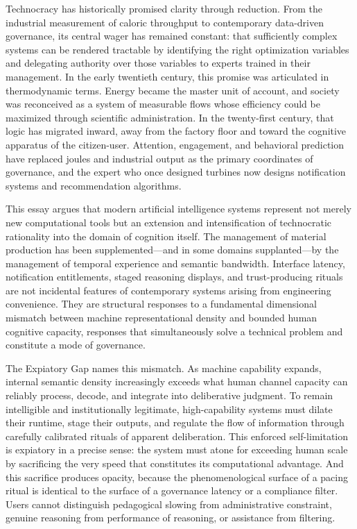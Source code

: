 \documentclass[12pt]{article}
\begin{document}
Technocracy has historically promised clarity through reduction. From the industrial measurement of caloric throughput to contemporary data-driven governance, its central wager has remained constant: that sufficiently complex systems can be rendered tractable by identifying the right optimization variables and delegating authority over those variables to experts trained in their management. In the early twentieth century, this promise was articulated in thermodynamic terms. Energy became the master unit of account, and society was reconceived as a system of measurable flows whose efficiency could be maximized through scientific administration. In the twenty-first century, that logic has migrated inward, away from the factory floor and toward the cognitive apparatus of the citizen-user. Attention, engagement, and behavioral prediction have replaced joules and industrial output as the primary coordinates of governance, and the expert who once designed turbines now designs notification systems and recommendation algorithms.

This essay argues that modern artificial intelligence systems represent not merely new computational tools but an extension and intensification of technocratic rationality into the domain of cognition itself. The management of material production has been supplemented---and in some domains supplanted---by the management of temporal experience and semantic bandwidth. Interface latency, notification entitlements, staged reasoning displays, and trust-producing rituals are not incidental features of contemporary systems arising from engineering convenience. They are structural responses to a fundamental dimensional mismatch between machine representational density and bounded human cognitive capacity, responses that simultaneously solve a technical problem and constitute a mode of governance.

The Expiatory Gap names this mismatch. As machine capability expands, internal semantic density increasingly exceeds what human channel capacity can reliably process, decode, and integrate into deliberative judgment. To remain intelligible and institutionally legitimate, high-capability systems must dilate their runtime, stage their outputs, and regulate the flow of information through carefully calibrated rituals of apparent deliberation. This enforced self-limitation is expiatory in a precise sense: the system must atone for exceeding human scale by sacrificing the very speed that constitutes its computational advantage. And this sacrifice produces opacity, because the phenomenological surface of a pacing ritual is identical to the surface of a governance latency or a compliance filter. Users cannot distinguish pedagogical slowing from administrative constraint, genuine reasoning from performance of reasoning, or assistance from filtering.
\end{document}
